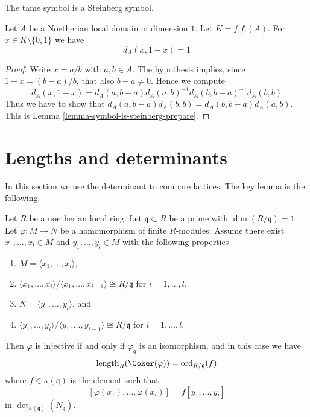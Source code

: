 \noindent
The tame symbol is a Steinberg symbol.

\begin{lemma}
\label{lemma-symbol-is-steinberg}
Let $A$ be a Noetherian local domain of dimension $1$.
Let $K = f.f.(A)$. For $x \in K \setminus \{0, 1\}$
we have
$$
d_A(x, 1 -x) = 1
$$
\end{lemma}

\begin{proof}
Write $x = a/b$ with $a, b \in A$.
The hypothesis implies, since $1 - x = (b - a)/b$,
that also $b - a \not = 0$. Hence we compute
$$
d_A(x, 1 - x)
=
d_A(a, b - a)d_A(a, b)^{-1}d_A(b, b - a)^{-1}d_A(b, b)
$$
Thus we have to show that
$d_A(a, b - a) d_A(b, b) = d_A(b, b - a) d_A(a, b)$.
This is Lemma \ref{lemma-symbol-is-steinberg-prepare}.
\end{proof}










\section{Lengths and determinants}
\label{section-length-determinant}

\noindent
In this section we use the determinant to compare lattices.
The key lemma is the following.

\begin{lemma}
\label{lemma-key-lemma}
Let $R$ be a noetherian local ring.
Let $\mathfrak q \subset R$ be a prime with $\dim(R/\mathfrak q) = 1$.
Let $\varphi : M \to N$ be a homomorphism of finite $R$-modules.
Assume there exist $x_1, \ldots, x_l \in M$ and $y_1, \ldots, y_l \in M$
with the following properties
\begin{enumerate}
\item $M = \langle x_1, \ldots, x_l\rangle$,
\item $\langle x_1, \ldots, x_i\rangle / \langle x_1, \ldots, x_{i - 1}\rangle
\cong R/\mathfrak q$ for $i = 1, \ldots, l$,
\item $N = \langle y_1, \ldots, y_l\rangle$, and
\item $\langle y_1, \ldots, y_i\rangle / \langle y_1, \ldots, y_{i - 1}\rangle
\cong R/\mathfrak q$ for $i = 1, \ldots, l$.
\end{enumerate}
Then $\varphi$ is injective if and only if $\varphi_{\mathfrak q}$ is an
isomorphism, and in this case we have
$$
\text{length}_R(\Coker(\varphi)) = \text{ord}_{R/\mathfrak q}(f)
$$
where $f \in \kappa(\mathfrak q)$ is the element such that
$$
[\varphi(x_1), \ldots, \varphi(x_l)] = f [y_1, \ldots, y_l]
$$
in $\det_{\kappa(\mathfrak q)}(N_{\mathfrak q})$.
\end{lemma}

